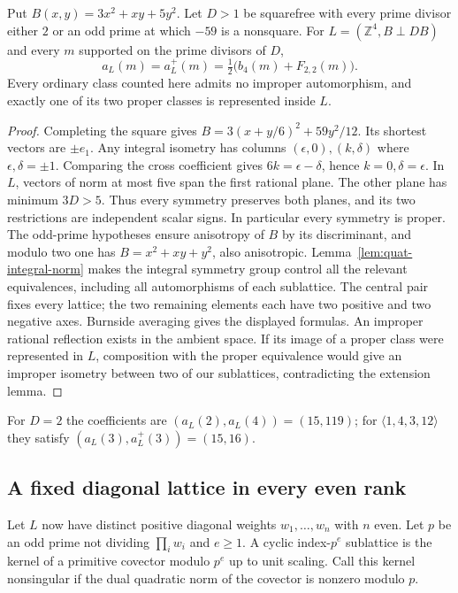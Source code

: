 \begin{theorem}\label{thm:quat-missing-mate}
Put $B(x,y)=3x^2+xy+5y^2$. Let $D>1$ be squarefree with every prime divisor either $2$ or an odd prime at which $-59$ is a nonsquare. For $L=(\mathbb Z^4,B\perp D B)$ and every $m$ supported on the prime divisors of $D$,
\[
 a_L(m)=a_L^+(m)=\tfrac12\bigl(b_4(m)+F_{2,2}(m)\bigr).
\]
Every ordinary class counted here admits no improper automorphism, and exactly one of its two proper classes is represented inside $L$.
\end{theorem}
\begin{proof}
Completing the square gives $B=3(x+y/6)^2+59y^2/12$. Its shortest vectors are $\pm e_1$. Any integral isometry has columns $(\epsilon,0),(k,\delta)$ where $\epsilon,\delta=\pm1$. Comparing the cross coefficient gives $6k=\epsilon-\delta$, hence $k=0,\delta=\epsilon$. In $L$, vectors of norm at most five span the first rational plane. The other plane has minimum $3D>5$. Thus every symmetry preserves both planes, and its two restrictions are independent scalar signs. In particular every symmetry is proper. The odd-prime hypotheses ensure anisotropy of $B$ by its discriminant, and modulo two one has $B=x^2+xy+y^2$, also anisotropic. Lemma~\ref{lem:quat-integral-norm} makes the integral symmetry group control all the relevant equivalences, including all automorphisms of each sublattice. The central pair fixes every lattice; the two remaining elements each have two positive and two negative axes. Burnside averaging gives the displayed formulas. An improper rational reflection exists in the ambient space. If its image of a proper class were represented in $L$, composition with the proper equivalence would give an improper isometry between two of our sublattices, contradicting the extension lemma.
\end{proof}
For $D=2$ the coefficients are $(a_L(2),a_L(4))=(15,119)$; for $\langle1,4,3,12\rangle$ they satisfy $(a_L(3),a_L^+(3))=(15,16)$.

\subsection{A fixed diagonal lattice in every even rank}
Let $L$ now have distinct positive diagonal weights $w_1,\ldots,w_n$ with $n$ even. Let $p$ be an odd prime not dividing $\prod_i w_i$ and $e\ge1$. A cyclic index-$p^e$ sublattice is the kernel of a primitive covector modulo $p^e$ up to unit scaling. Call this kernel nonsingular if the dual quadratic norm of the covector is nonzero modulo $p$.

